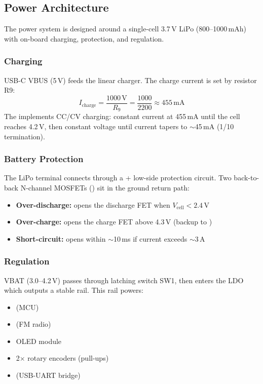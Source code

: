 \subsection{Power Architecture}

The power system is designed around a single-cell 3.7\,V LiPo (800–1000\,mAh)
with on-board charging, protection, and regulation.

\subsubsection{Charging}

USB-C VBUS (5\,V) feeds the  linear charger.  The charge current
is set by  resistor R9:
%
\[
  I_{\text{charge}} = \frac{1000\,\text{V}}{R_9}
                    = \frac{1000}{2200} \approx 455\,\text{mA}
\]
%
The  implements CC/CV charging: constant current at 455\,mA until
the cell reaches 4.2\,V, then constant voltage until current tapers to
$\sim$45\,mA (1/10 termination).

\subsubsection{Battery Protection}

The LiPo  terminal connects through a  + 
low-side protection circuit.  Two back-to-back N-channel MOSFETs
() sit in the ground return path:
%
\begin{itemize}[leftmargin=1.8em, itemsep=2pt]
  \item \textbf{Over-discharge:}  opens the discharge FET when
        $V_{\text{cell}} < 2.4$\,V
  \item \textbf{Over-charge:} opens the charge FET above 4.3\,V (backup to
        )
  \item \textbf{Short-circuit:} opens within $\sim$10\,ms if current exceeds
        $\sim$3\,A
\end{itemize}

\subsubsection{Regulation}

VBAT (3.0–4.2\,V) passes through latching switch SW1, then enters the
 LDO which outputs a stable  rail.  This rail powers:
%
\begin{itemize}[leftmargin=1.8em, itemsep=2pt]
  \item {} (MCU)
  \item {} (FM radio)
  \item {} OLED module
  \item 2$\times$ rotary encoders (pull-ups)
  \item {} (USB-UART bridge)
\end{itemize}

